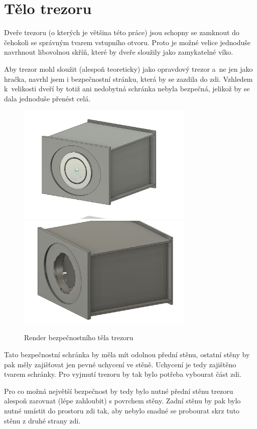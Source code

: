\section{Tělo trezoru}
Dveře trezoru (o kterých je většina této práce) jsou schopny se zamknout do čehokoli se správným tvarem vstupního otvoru. 
Proto je možné velice jednoduše navrhnout libovolnou skříň, které by dveře sloužily jako zamykatelné víko. 

Aby trezor mohl sloužit (alespoň teoreticky) jako opravdový trezor a~ne jen jako hračka, navrhl jsem i bezpečnostní stránku, která by se zazdila do zdi. 
Vzhledem k~velikosti dveří by totiž ani nedobytná schránka nebyla bezpečná, jelikož by se dala jednoduše přenést celá.

\begin{figure}[htbp]
    \centering
    \includegraphics[width=240pt]{kapitoly/obrazky/E4/bedna/bedna.png}
    \includegraphics[width=240pt]{kapitoly/obrazky/E4/bedna/jen-bedna.png}
    \caption{Render bezpečnostního těla trezoru}
    \label{fig:E4-bedna}
\end{figure}

Tato bezpečnostní schránka by měla mít odolnou přední stěnu, ostatní stěny by pak měly zajišťovat jen pevné uchycení ve stěně.
Uchycení je tedy zajištěno tvarem schránky. Pro vyjmutí trezoru by tak bylo potřeba vybourat část zdi.
\enlargethispage{5mm}

Pro co možná největší bezpečnost by tedy bylo nutné přední stěnu trezoru alespoň zarovnat (lépe zahloubit) s povrchem stěny.
Zadní stěnu by pak bylo nutné umístit do prostoru zdi tak, aby nebylo snadné se probourat skrz tuto stěnu z druhé strany zdi.
